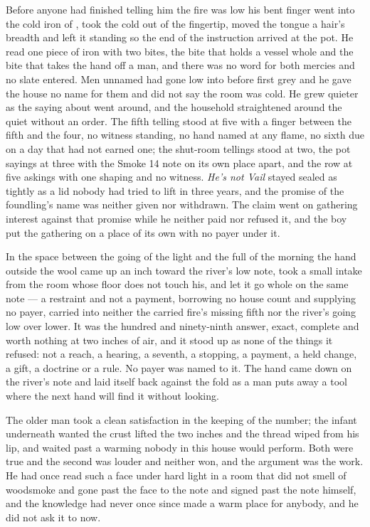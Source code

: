 Before anyone had finished telling him the fire was low his bent finger went into the cold iron of , took the cold out of the fingertip, moved the tongue a hair's breadth and left it standing so the end of the instruction arrived at the pot. He read one piece of iron with two bites, the bite that holds a vessel whole and the bite that takes the hand off a man, and there was no  word for both mercies and no slate entered. Men unnamed had gone low into  before first grey and he gave the house no name for them and did not say the room was cold. He grew quieter as the saying about  went around, and the household straightened around the quiet without an order. The fifth telling stood at five with a finger between the fifth and the four, no witness standing, no hand named at any flame, no sixth due on a day that had not earned one; the shut-room tellings stood at two, the pot sayings at three with the Smoke 14 note on its own place apart, and the row at five askings with one shaping and no witness. \emph{He's not Vail} stayed sealed as tightly as a lid nobody had tried to lift in three years, and the promise of the foundling's name was neither given nor withdrawn. The claim went on gathering interest against that promise while he neither paid nor refused it, and the boy put the gathering on a place of its own with no payer under it.

\scenebreak

In the space between the going of the light and the full of the morning the hand outside the wool came up an inch toward the river's low note, took a small intake from the room whose floor does not touch his, and let it go whole on the same note --- a restraint and not a payment, borrowing no house count and supplying no payer, carried into neither the carried fire's missing fifth nor the river's going low over lower. It was the hundred and ninety-ninth answer, exact, complete and worth nothing at two inches of air, and it stood up as none of the things it refused: not a reach, a hearing, a seventh, a stopping, a payment, a held change, a gift, a doctrine or a rule. No payer was named to it. The hand came down on the river's note and laid itself back against the fold as a man puts away a tool where the next hand will find it without looking.

The older man took a clean satisfaction in the keeping of the number; the infant underneath wanted the crust lifted the two inches and the thread wiped from his lip, and  waited past a warming nobody in this house would perform. Both were true and the second was louder and neither won, and the argument was the work. He had once read such a face under hard light in a room that did not smell of woodsmoke and gone past the face to the note and signed past the note himself, and the knowledge had never once since made a warm place for anybody, and he did not ask it to now.

